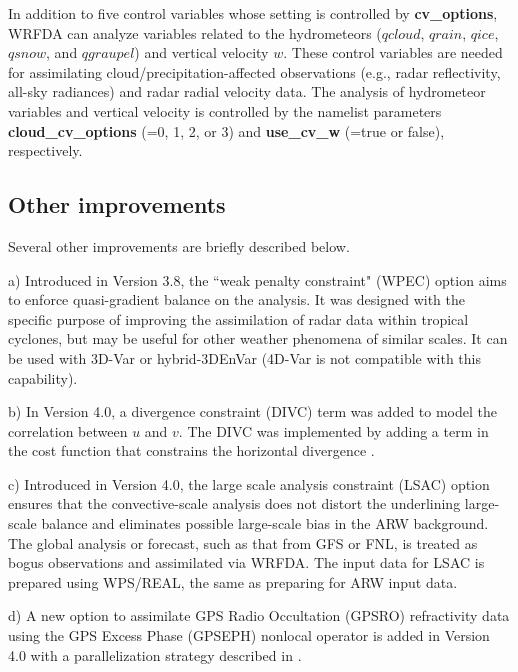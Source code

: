 In addition to five control variables whose setting is controlled by {\bf cv\_options}, WRFDA can analyze variables related
to the hydrometeors ($qcloud$, $qrain$, $qice$, $qsnow$, and $qgraupel$) and vertical velocity $w$. These control variables
are needed for assimilating cloud/precipitation-affected observations (e.g., radar reflectivity, all-sky radiances) and 
radar radial velocity data. The analysis of hydrometeor variables and vertical velocity is controlled by the namelist parameters
{\bf cloud\_cv\_options} (=0, 1, 2, or 3) and {\bf use\_cv\_w} (=true or false), respectively.

\subsection{Other improvements}

Several other improvements are briefly described below.

\vspace{0.5cm}

a) Introduced in Version 3.8, the ``weak penalty constraint" (WPEC) option \citep{li15} aims to enforce quasi-gradient balance on the analysis. 
It was designed with the specific purpose of improving the assimilation of radar data within tropical cyclones, but may be useful 
for other weather phenomena of similar scales. It can be used with 3D-Var or hybrid-3DEnVar (4D-Var is not compatible with this capability).

\vspace{0.5cm}

b) In Version 4.0, a divergence constraint (DIVC) term was added to model the correlation between $u$ and $v$. The DIVC was implemented by adding a term in the cost function that constrains the horizontal divergence \citep{tong16}. 

\vspace{0.5cm}

c) Introduced in Version 4.0, the large scale analysis constraint (LSAC) option \citep{ven16} ensures that the convective-scale 
analysis does not distort the underlining large-scale balance and eliminates possible large-scale bias in the ARW background. The global analysis or forecast, such as that from GFS or FNL, is treated as bogus observations and assimilated via WRFDA. The input data for LSAC is prepared using WPS/REAL, the same as preparing for ARW input data.

\vspace{0.5cm}

d) A new option to assimilate GPS Radio Occultation (GPSRO) refractivity data using the GPS Excess Phase (GPSEPH)
nonlocal operator \citep{chen09} is added in Version 4.0 with a parallelization strategy described in \citep{zhang14b}.

